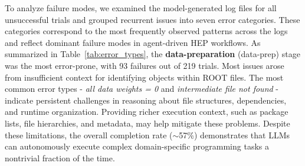 \documentclass[aps,prd,reprint,superscriptaddress]{revtex4-2}
\begin{document}
\begin{table}[htbp]
\centering
{} %

\vspace{6pt}
\caption{
Distribution of failure counts by error category across the three workflow stages, based on 219 trials per step. Each row lists the number of failures attributable to a given error type; the bottom row reports the total failures per stage.
}
\label{tab:error_types}
\end{table}
To analyze failure modes, we examined the model-generated log files for all unsuccessful trials and grouped recurrent issues into seven error categories. These categories correspond to the most frequently observed patterns across the logs and reflect dominant failure modes in agent-driven HEP workflows. As summarized in Table~\ref{tab:error_types}, the \textbf{data-preparation} (data-prep) stage was the most error-prone, with 93 failures out of 219 trials. Most issues arose from insufficient context for identifying objects within \textsc{ROOT} files. The most common error types - \textit{all data weights = 0} and \textit{intermediate file not found} - indicate persistent challenges in reasoning about file structures, dependencies, and runtime organization. Providing richer execution context, such as package lists, file hierarchies, and metadata, may help mitigate these problems. Despite these limitations, the overall completion rate ($\sim$57\%) demonstrates that LLMs can autonomously execute complex domain-specific programming tasks a nontrivial fraction of the time.
\end{document}
